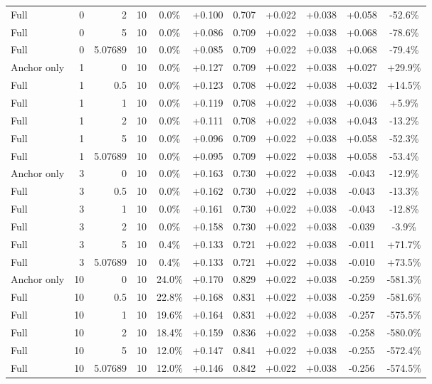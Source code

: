 \begin{table}[htbp]
\begin{tabular}{lrrrccccccc}
Full & 0 & 2 & 10 & 0.0\% & +0.100 & 0.707 & +0.022 & +0.038 & +0.058 & -52.6\% \\
Full & 0 & 5 & 10 & 0.0\% & +0.086 & 0.709 & +0.022 & +0.038 & +0.068 & -78.6\% \\
Full & 0 & 5.07689 & 10 & 0.0\% & +0.085 & 0.709 & +0.022 & +0.038 & +0.068 & -79.4\% \\
Anchor only & 1 & 0 & 10 & 0.0\% & +0.127 & 0.709 & +0.022 & +0.038 & +0.027 & +29.9\% \\
Full & 1 & 0.5 & 10 & 0.0\% & +0.123 & 0.708 & +0.022 & +0.038 & +0.032 & +14.5\% \\
Full & 1 & 1 & 10 & 0.0\% & +0.119 & 0.708 & +0.022 & +0.038 & +0.036 & +5.9\% \\
Full & 1 & 2 & 10 & 0.0\% & +0.111 & 0.708 & +0.022 & +0.038 & +0.043 & -13.2\% \\
Full & 1 & 5 & 10 & 0.0\% & +0.096 & 0.709 & +0.022 & +0.038 & +0.058 & -52.3\% \\
Full & 1 & 5.07689 & 10 & 0.0\% & +0.095 & 0.709 & +0.022 & +0.038 & +0.058 & -53.4\% \\
Anchor only & 3 & 0 & 10 & 0.0\% & +0.163 & 0.730 & +0.022 & +0.038 & -0.043 & -12.9\% \\
Full & 3 & 0.5 & 10 & 0.0\% & +0.162 & 0.730 & +0.022 & +0.038 & -0.043 & -13.3\% \\
Full & 3 & 1 & 10 & 0.0\% & +0.161 & 0.730 & +0.022 & +0.038 & -0.043 & -12.8\% \\
Full & 3 & 2 & 10 & 0.0\% & +0.158 & 0.730 & +0.022 & +0.038 & -0.039 & -3.9\% \\
Full & 3 & 5 & 10 & 0.4\% & +0.133 & 0.721 & +0.022 & +0.038 & -0.011 & +71.7\% \\
Full & 3 & 5.07689 & 10 & 0.4\% & +0.133 & 0.721 & +0.022 & +0.038 & -0.010 & +73.5\% \\
Anchor only & 10 & 0 & 10 & 24.0\% & +0.170 & 0.829 & +0.022 & +0.038 & -0.259 & -581.3\% \\
Full & 10 & 0.5 & 10 & 22.8\% & +0.168 & 0.831 & +0.022 & +0.038 & -0.259 & -581.6\% \\
Full & 10 & 1 & 10 & 19.6\% & +0.164 & 0.831 & +0.022 & +0.038 & -0.257 & -575.5\% \\
Full & 10 & 2 & 10 & 18.4\% & +0.159 & 0.836 & +0.022 & +0.038 & -0.258 & -580.0\% \\
Full & 10 & 5 & 10 & 12.0\% & +0.147 & 0.841 & +0.022 & +0.038 & -0.255 & -572.4\% \\
Full & 10 & 5.07689 & 10 & 12.0\% & +0.146 & 0.842 & +0.022 & +0.038 & -0.256 & -574.5\% \\

\end{tabular}
\end{table}
